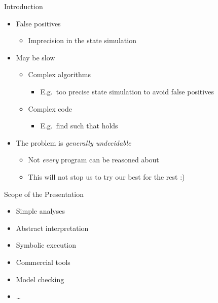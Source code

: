 \begin{frame}{Introduction}

  \begin{itemize}
    \item False positives
    \begin{itemize}
      \item Imprecision in the state simulation
    \end{itemize}

    \pause

    \item May be slow
    \begin{itemize}
      \item Complex algorithms
      \begin{itemize}
	\item E.g.\ too precise state simulation to avoid false positives
      \end{itemize}

      \item Complex code
      \begin{itemize}
	\item E.g.\ find  such that  holds
      \end{itemize}
    \end{itemize}

    \pause

    \item The problem is \emph{generally undecidable}
    \begin{itemize}
      \item Not \emph{every} program can be reasoned about

      \pause

      \item This will not stop us to try our best for the rest :)
    \end{itemize}

  \end{itemize}

\end{frame}

\begin{frame}{Scope of the Presentation}

  \begin{itemize}
    \item Simple analyses
    \item Abstract interpretation
    \item Symbolic execution
  \end{itemize}

  \pause
  \bigskip

  \begin{itemize}
    \item Commercial tools
    \item Model checking
    \item \dots
  \end{itemize}

\end{frame}

